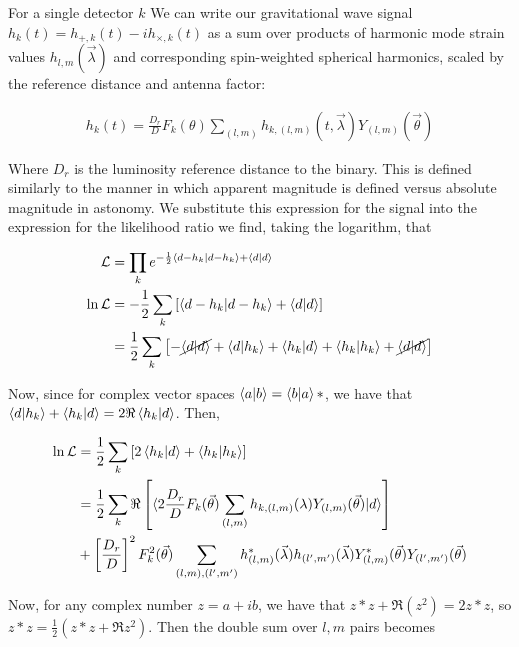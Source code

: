 For a single detector $k$ We can write our gravitational wave signal $h_k(t) = h_{+,k}(t) - ih_{\times, k}(t)$ as a sum over products of harmonic mode strain values $h_{l,m}(\vec{\lambda})$ and corresponding spin-weighted spherical harmonics, scaled by the reference distance and antenna factor:

\begin{align}
h_k(t) = \frac{D_r}{D}F_k(\theta)\sum_{(l,m)}h_{k, (l,m)}(t, \vec{\lambda})Y_{(l,m)}(\vec{\theta})
\end{align}

Where $D_r$ is the luminosity reference distance to the binary. This is defined similarly to the manner in which apparent magnitude is defined versus absolute magnitude in astonomy. We substitute this expression for the signal into the expression for the likelihood ratio we find, taking the logarithm, that

\begin{align}
\mathcal{L} &= \prod_k e^{-\frac{1}{2}\braket{d - h_k|d-h_k} + \braket{d|d}} \\
\ln\mathcal{L} &= -\frac{1}{2}\sum_{k}\left[\braket{d - h_k|d-h_k} + \braket{d|d}\right] \\
&= \frac{1}{2}\sum_{k}\left[-\cancel{\braket{d|d}}+\braket{d|h_k}+\braket{h_k|d}+\braket{h_k|h_k} + \cancel{\braket{d|d}}\right] \\
\end{align}

Now, since for complex vector spaces $\braket{a|b} = \braket{b|a}*$, we have that $\braket{d|h_k} + \braket{h_k|d} = 2\Re\braket{h_k|d}$. Then, 

\begin{align}
\ln\mathcal{L} &= \frac{1}{2}\sum_{k}\left[2\braket{h_k|d} + \braket{h_k|h_k}\right] \\
&= \frac{1}{2} \sum_{k}\Re\left[\braket{2\frac{D_r}{D}F_k(\vec{\theta})\sum_{(l,m)}h_{k,(l,m)}(\lambda)Y_{(l,m)}(\vec{\theta})|d}\right] \\
&+ \left[\frac{D_r}{D}\right]^2F_k^2(\vec{\theta})\sum_{(l,m),(l',m')}h^*_{(l,m)}(\vec{\lambda})h_{(l',m')}(\vec{\lambda})Y^*_{(l,m)}(\vec{\theta})Y_{(l',m')}(\vec{\theta})
\end{align}  

Now, for any complex number $z = a + ib$, we have that $z*z + \Re(z^2) = 2z*z$, so $z*z = \frac{1}{2}(z*z + \Re z^2)$. Then the double sum over $l,m$ pairs becomes




